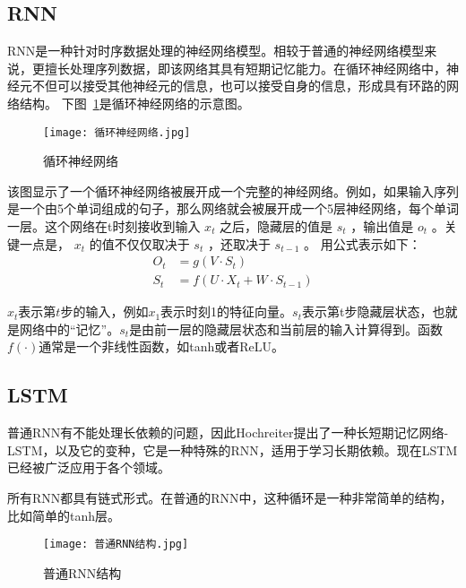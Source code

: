 \subsection{RNN}
RNN是一种针对时序数据处理的神经网络模型。相较于普通的神经网络模型来说，更擅长处理序列数据，即该网络其具有短期记忆能力。在循环神经网络中，神经元不但可以接受其他神经元的信息，也可以接受自身的信息，形成具有环路的网络结构。
下图~\ref{fig:循环神经网络}是循环神经网络的示意图。
\begin{figure}
    \centering
    \texttt{[image: 循环神经网络.jpg]}
    \caption{循环神经网络}
    \label{fig:循环神经网络}
  \end{figure}
该图显示了一个循环神经网络被展开成一个完整的神经网络。例如，如果输入序列是一个由5个单词组成的句子，那么网络就会被展开成一个5层神经网络，每个单词一层。这个网络在t时刻接收到输入 $x_t$ 之后，隐藏层的值是 $s_t$ ，输出值是 $o_t$ 。关键一点是， $x_t$ 的值不仅仅取决于 $s_t$ ，还取决于 $s_{t-1}$ 。
  用公式表示如下：
  \begin{equation}
      \begin{aligned}
          O_t &= g(V\cdot S_t) \\
          S_t &= f(U\cdot X_t + W\cdot S_{t-1})
      \end{aligned}
  \end{equation}

  $x_t$表示第$t$步的输入，例如$x_1$表示时刻1的特征向量。$s_t$表示第t步隐藏层状态，也就是网络中的“记忆”。$s_t$是由前一层的隐藏层状态和当前层的输入计算得到。函数$f(\cdot)$通常是一个非线性函数，如tanh或者ReLU。

\subsection{LSTM}
普通RNN有不能处理长依赖的问题，因此Hochreiter提出了一种长短期记忆网络-LSTM，以及它的变种，它是一种特殊的RNN，适用于学习长期依赖。现在LSTM已经被广泛应用于各个领域。

所有RNN都具有链式形式。在普通的RNN中，这种循环是一种非常简单的结构，比如简单的tanh层。
\begin{figure}
    \centering
    \texttt{[image: 普通RNN结构.jpg]}
    \caption{普通RNN结构}
    \label{fig:普通RNN结构}
  \end{figure}

